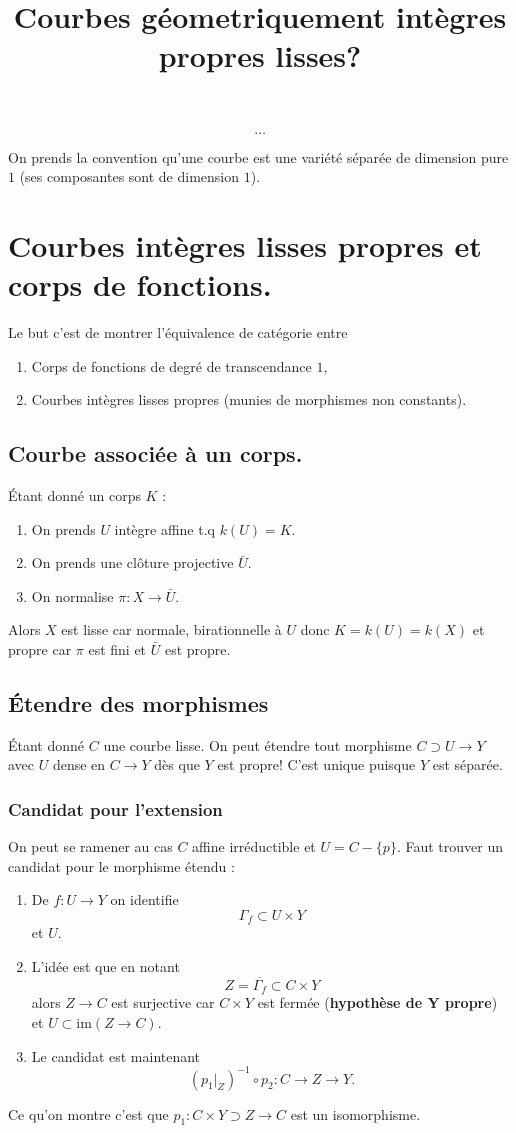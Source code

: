 \documentclass[a4paper,12pt]{book}
\title{Courbes géometriquement intègres propres lisses?}
\date{}
\newcommand{\im}{\textrm{im}}
\theoremstyle{plain}
\theoremstyle{definition}
\theoremstyle{remark}
\begin{document}
\maketitle
\tableofcontents
\[\ldots\]   

On prends la convention qu'une courbe est une variété
séparée de dimension pure $1$ (ses composantes sont de dimension
$1$).
\chapter{Courbes intègres lisses propres et corps de fonctions.}
Le but c'est de montrer l'équivalence de catégorie entre 
\begin{enumerate}
  \item Corps de fonctions de degré de transcendance $1$,
  \item Courbes intègres lisses propres (munies de morphismes non constants).
\end{enumerate}
\section{Courbe associée à un corps.}
Étant donné un corps $K$ :
\begin{enumerate}
  \item On prends $U$ intègre affine t.q $k(U)=K$.
  \item On prends une clôture projective $\bar U$.
  \item On normalise $\pi\colon X\to \bar U$.
\end{enumerate}
Alors $X$ est lisse car normale, birationnelle à
$U$ donc $K=k(U)=k(X)$ et propre car $\pi$ est fini
et $\bar U$ est propre.

\section{Étendre des morphismes}
Étant donné $C$ une courbe lisse. On peut étendre
tout morphisme $C\supset U \to Y$ avec $U$ dense 
en $C\to Y$ dès que $Y$ est propre!
C'est unique puisque $Y$ est séparée.
\subsection{Candidat pour l'extension}
On peut se ramener au cas $C$ affine irréductible 
et $U=C-\{p\}$. Faut trouver un candidat pour
le morphisme étendu :
\begin{enumerate}
  \item De $f\colon U\to Y$ on identifie 
    \[\Gamma_f\subset U\times Y\]
    et $U$. 
  \item L'idée est que en notant
    \[Z=\overline{\Gamma_f}\subset C\times Y\]
    alors $Z\to C$ est surjective car $C\times Y$ est fermée
    (\textbf{hypothèse de Y propre})
    et $U\subset \im(Z\to C)$.
  \item Le candidat est maintenant
    \[(p_1|_{Z})^{-1}\circ p_2 \colon C\to Z \to Y.\]
\end{enumerate} 
Ce qu'on montre c'est que $p_1\colon C\times Y \supset Z\to C$
est un isomorphisme. 
\end{document}
